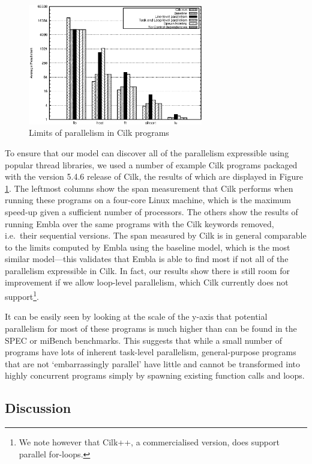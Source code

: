 \begin{figure}
 \centering
 \includegraphics[width=3in]{cilk}
 \caption{Limits of parallelism in Cilk programs}
 \label{cilk}
\end{figure}

To ensure that our model can discover all of the parallelism expressible using popular thread libraries, we used a number of example Cilk programs packaged with the version 5.4.6 release of Cilk, the results of which are displayed in Figure \ref{cilk}.
The leftmost columns show the span measurement that Cilk performs when running these programs on a four-core Linux machine, which is the maximum speed-up given a sufficient number of processors.
The others show the results of running Embla over the same programs with the Cilk keywords removed, i.e.\ their sequential versions.
The span measured by Cilk is in general comparable to the limits computed by Embla using the baseline model, which is the most similar model---this validates that Embla is able to find most if not all of the parallelism expressible in Cilk.
In fact, our results show there is still room for improvement if we allow loop-level parallelism, which Cilk currently does not support\footnote{We note however that Cilk++, a commercialised version, does support parallel for-loops.}.

It can be easily seen by looking at the scale of the y-axis that potential parallelism for most of these programs is much higher than can be found in the SPEC or miBench benchmarks.
This suggests that while a small number of programs have lots of inherent task-level parallelism, general-purpose programs that are not `embarrassingly parallel' have little and cannot be transformed into highly concurrent programs simply by spawning existing function calls and loops.

\subsection{Discussion}

